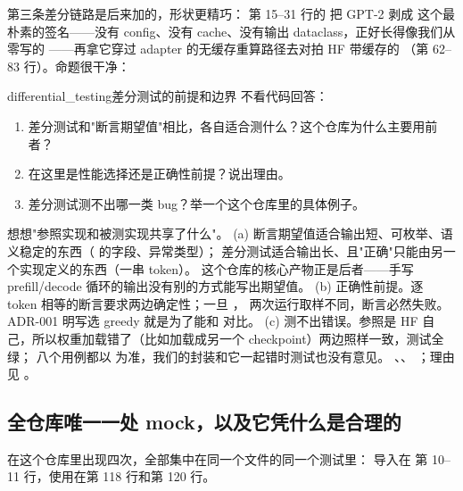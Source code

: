 第三条差分链路是后来加的，形状更精巧：
第 15--31 行的  把 GPT-2 剥成 
这个最朴素的签名——没有 config、没有 cache、没有输出 dataclass，正好长得像我们从零写的
——再拿它穿过 adapter 的无缓存重算路径去对拍 HF 带缓存的
（第 62--83 行）。命题很干净：

\begin{checkpoint}{differential_testing}{差分测试的前提和边界}
不看代码回答：
\begin{enumerate}[label=(\alph*)]
  \item 差分测试和"断言期望值"相比，各自适合测什么？这个仓库为什么主要用前者？
  \item {} 在这里是性能选择还是正确性前提？说出理由。
  \item 差分测试测不出哪一类 bug？举一个这个仓库里的具体例子。
\end{enumerate}
\hint 想想"参照实现和被测实现共享了什么"。
\ifshowanswers
\tcblower
\answer (a) 断言期望值适合输出短、可枚举、语义稳定的东西（ 的字段、异常类型）；
差分测试适合输出长、且"正确"只能由另一个实现定义的东西（一串 token）。
这个仓库的核心产物正是后者——手写 prefill/decode 循环的输出没有别的方式能写出期望值。
(b) 正确性前提。逐 token 相等的断言要求两边确定性；一旦 ，
两次运行取样不同，断言必然失败。ADR-001 明写选 greedy 就是为了能和  对比。
(c) 测不出错误。参照是 HF 自己，所以权重加载错了（比如加载成另一个
checkpoint）两边照样一致，测试全绿； 八个用例都以
 为准，我们的封装和它一起错时测试也没有意见。
\whereincode {}、、
；理由见
。
\fi
\end{checkpoint}

\subsection{全仓库唯一一处 mock，以及它凭什么是合理的}
\label{sec:test-mock}

 在这个仓库里出现四次，全部集中在同一个文件的同一个测试里：
导入在  第 10--11 行，使用在第 118 行和第 120 行。

